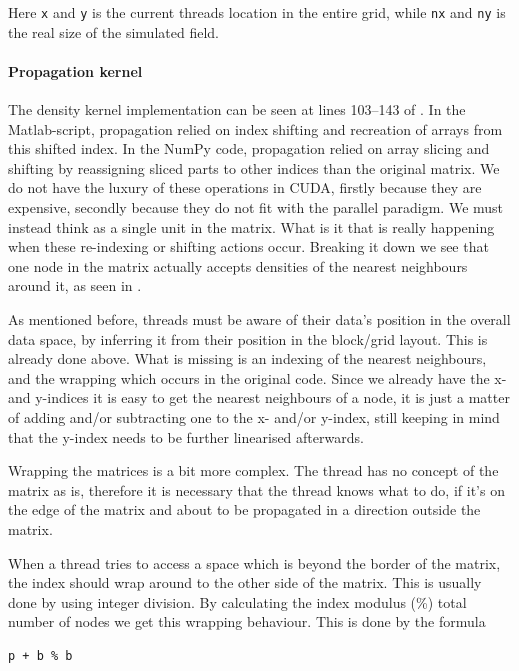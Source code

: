 Here \texttt{x} and \texttt{y} is the current threads location in the entire grid, while \texttt{nx} and \texttt{ny} is the real size of the simulated field. 


\paragraph{Propagation kernel} The density kernel implementation can be seen at lines 103--143 of . In the Matlab-script, propagation relied on index shifting and recreation of arrays from this shifted index. In the NumPy code, propagation relied on array slicing and shifting by reassigning sliced parts to other indices than the original matrix. We do not have the luxury of these operations in CUDA, firstly because they are expensive, secondly because they do not fit with the parallel paradigm. We must instead think as a single unit in the matrix. What is it that is really happening when these re-indexing or shifting actions occur. Breaking it down we see that one node in the matrix actually accepts densities of the nearest neighbours around it, as seen in .

As mentioned before, threads must be aware of their data's position in the overall data space, by inferring it from their position in the block/grid layout. This is already done above. What is missing is an indexing of the nearest neighbours, and the wrapping which occurs in the original code. Since we already have the x- and y-indices it is easy to get the nearest neighbours of a node, it is just a matter of adding and/or subtracting one to the x- and/or y-index, still keeping in mind that the y-index needs to be further linearised afterwards.

Wrapping the matrices is a bit more complex. The thread has no concept of the matrix as is, therefore it is necessary that the thread knows what to do, if it's on the edge of the matrix and about to be propagated in a direction outside the matrix.

When a thread tries to access a space which is beyond the border of the matrix, the index should wrap around to the other side of the matrix. This is usually done by using integer division. By calculating the index modulus (\%) total number of nodes we get this wrapping behaviour. This is done by the formula

\begin{verbatim}
p + b % b
\end{verbatim}


